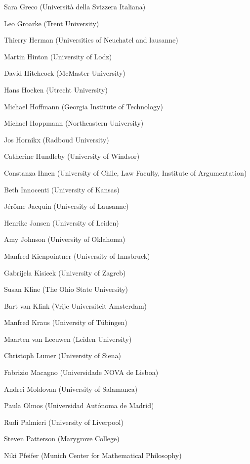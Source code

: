 \begin{compactitem}[]
		\item[] Sara Greco (Università della Svizzera Italiana)
		\item[] Leo Groarke (Trent University)
		\item[] Thierry Herman (Universities of Neuchatel and lausanne)
		\item[] Martin Hinton (University of Lodz)
		\item[] David Hitchcock (McMaster University)
		\item[] Hans Hoeken (Utrecht University)
		\item[] Michael Hoffmann (Georgia Institute of Technology)
		\item[] Michael Hoppmann (Northeastern University)
		\item[] Jos Hornikx (Radboud University)
		\item[] Catherine Hundleby (University of Windsor)
		\item[] Constanza Ihnen (University of Chile, Law Faculty, Institute of Argumentation)
		\item[] Beth Innocenti (University of Kansas)
		\item[] Jérôme Jacquin (University of Lausanne)
		\item[] Henrike Jansen (University of Leiden)
		\item[] Amy Johnson (University of Oklahoma)
		\item[] Manfred Kienpointner (University of Innsbruck)
		\item[] Gabrijela Kisicek (University of Zagreb)
		\item[] Susan Kline (The Ohio State University)
		\item[] Bart van Klink (Vrije Universiteit Amsterdam)
		\item[] Manfred Kraus (University of Tübingen)
		\item[] Maarten van Leeuwen (Leiden University)
		\item[] Christoph Lumer (University of Siena)
		\item[] Fabrizio Macagno (Universidade NOVA de Lisboa)
		\item[] Andrei Moldovan (University of Salamanca)
		\item[] Paula Olmos (Universidad Autónoma de Madrid)
		\item[] Rudi Palmieri (University of Liverpool)
		\item[] Steven Patterson (Marygrove College)
		\item[] Niki Pfeifer (Munich Center for Mathematical Philosophy)

\end{compactitem}

